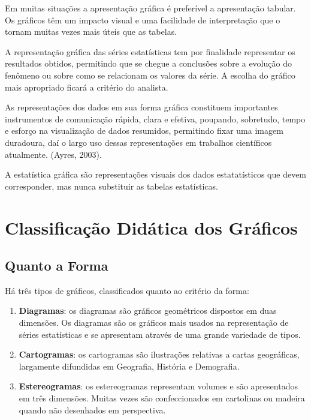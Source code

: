 Em muitas situações a apresentação gráfica é preferível a apresentação tabular. Os gráficos têm um impacto visual e uma facilidade de interpretação que o tornam muitas vezes mais úteis que as tabelas.\vskip0.3cm

A representação gráfica das séries estatísticas tem por finalidade representar os resultados obtidos, permitindo que se chegue a conclusões sobre a evolução do fenômeno ou sobre como se relacionam os valores da série. A escolha do gráfico mais apropriado ficará a critério do analista.\vskip0.3cm

As representações dos dados em sua forma gráfica constituem
importantes instrumentos de comunicação rápida, clara e efetiva,
poupando, sobretudo, tempo e esforço na visualização de dados
resumidos, permitindo fixar uma imagem duradoura, daí o largo uso
dessas representações em trabalhos científicos atualmente. (Ayres,
2003).\vskip0.3cm

A estatística gráfica são representações visuais dos dados
estatatísticos que devem corresponder, mas nunca substituir as
tabelas estatísticas.


\newpage
\section{Classificação Didática dos Gráficos}

\subsection{Quanto a Forma}

Há três tipos de gráficos, classificados quanto ao critério da forma:

\begin{enumerate}
  \item \textbf{Diagramas}: os diagramas são gráficos geométricos dispostos em duas dimensões. Os diagramas são os gráficos mais usados na representação de séries estatísticas e se  apresentam através de uma grande variedade de tipos.
\item \textbf{Cartogramas}: os cartogramas são ilustrações relativas a cartas geográficas, largamente difundidas em Geografia, História e Demografia.
\item \textbf{Estereogramas}: os estereogramas representam volumes e são apresentados em três dimensões. Muitas vezes são confeccionados em cartolinas ou madeira quando não desenhados em perspectiva.
\end{enumerate}

